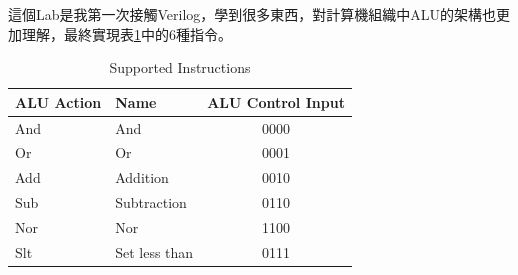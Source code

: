 \documentclass[12pt,a4paper]{article}
\theoremstyle{definition}
\begin{document}
這個Lab是我第一次接觸Verilog，學到很多東西，對計算機組織中ALU的架構也更加理解，最終實現表\ref{tab:support}中的6種指令。
\begin{table}[H]
\centering
\caption
{Supported Instructions}
\label{tab:support}
\begin{tabular}{llc} \toprule
ALU Action & Name & ALU Control Input \\
\midrule
And & And & 0000
\\
Or & Or & 0001
\\
Add & Addition & 0010
\\
Sub & Subtraction & 0110
\\
Nor & Nor & 1100
\\
Slt & Set less than & 0111
\\ \bottomrule
\end{tabular}
\end{table}




\end{document}

